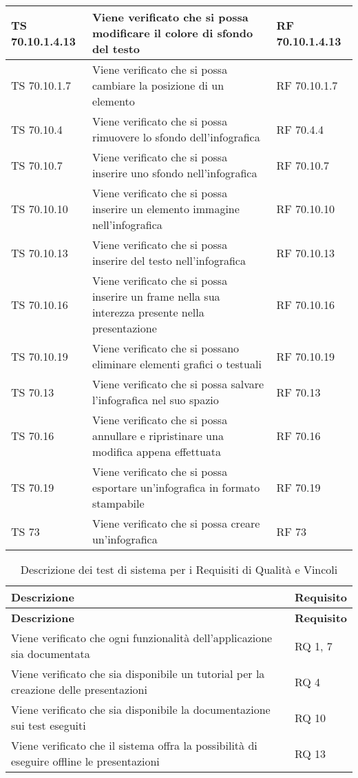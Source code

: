 {{\begin{longtable} [c]{| p{3cm} | p{6cm} |p{3cm}|}
			\hline
			TS 70.10.1.4.13 & Viene verificato che si possa modificare il colore di sfondo del testo & RF 70.10.1.4.13\\
			\hline
			TS 70.10.1.7 & Viene verificato che si possa cambiare la posizione di un elemento & RF 70.10.1.7\\
			\hline
			TS 70.10.4 & Viene verificato che si possa rimuovere lo sfondo dell'infografica\ped{g} & RF 70.4.4\\
			\hline
			TS 70.10.7 & Viene verificato che si possa inserire uno sfondo nell'infografica\ped{g} & RF 70.10.7\\
			\hline
			TS 70.10.10 & Viene verificato che si possa inserire un elemento immagine nell'infografica\ped{g} & RF 70.10.10\\
			\hline
			TS 70.10.13 & Viene verificato che si possa inserire del testo nell'infografica\ped{g} & RF 70.10.13\\
			\hline
			TS 70.10.16 & Viene verificato che si possa inserire un frame\ped{g} nella sua interezza presente nella presentazione & RF 70.10.16\\
			\hline
			TS 70.10.19 & Viene verificato che si possano eliminare elementi grafici o testuali & RF 70.10.19\\
			\hline
			TS 70.13 & Viene verificato che si possa salvare l'infografica\ped{g} nel suo spazio & RF 70.13\\
			\hline
			TS 70.16 & Viene verificato che si possa annullare e ripristinare una modifica appena effettuata & RF 70.16\\
			\hline
			TS 70.19 & Viene verificato che si possa esportare un'infografica\ped{g} in formato stampabile & RF 70.19\\
			\hline
			TS 73 & Viene verificato che si possa creare un'infografica\ped{g} & RF 73\\
			\hline
\end{longtable}

		\renewcommand*{\arraystretch}{1.4}
		\begin{longtable} [c]{| p{7cm} |p{4cm}|}
			\caption{
			Descrizione dei test di sistema
			per i Requisiti di Qualità e Vincoli \label{tab:verReqQualVinc}}\\
			 \hline
			 \textbf{Descrizione} & \textbf{Requisito} \\
			 \hline
			 \endfirsthead
			 \hline
			 \textbf{Descrizione} & \textbf{Requisito} \\
			 \hline
			\endhead
			 \hline
			 \endfoot
			 \hline
			 \endlastfoot
			Viene verificato che ogni funzionalità dell'applicazione sia documentata & RQ 1, 7\\
			\hline
			Viene verificato che sia disponibile un tutorial per la creazione delle presentazioni & RQ 4\\
			\hline
			Viene verificato che sia disponibile la documentazione sui test eseguiti & RQ 10\\
			\hline
			Viene verificato che il sistema offra la possibilità di eseguire offline le presentazioni & RQ 13\\
\end{longtable}
}
}
